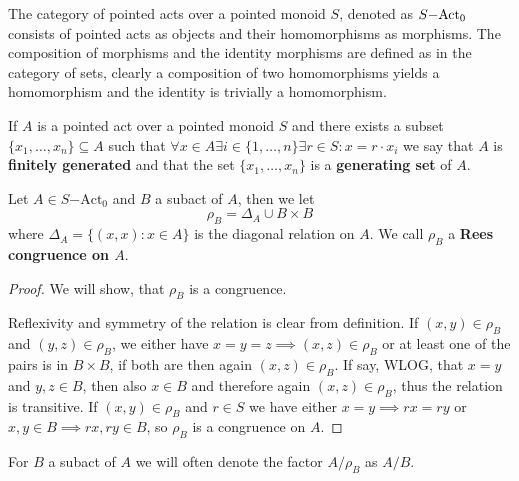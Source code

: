 \begin{remark}
    The category of pointed acts over a pointed monoid $S$, denoted as $S\mathrm{-Act}_0$ consists of pointed acts as objects and their homomorphisms as morphisms.
    The composition of morphisms and the identity morphisms are defined as in the category of sets, clearly a composition of two homomorphisms yields a homomorphism
    and the identity is trivially a homomorphism.
\end{remark}
\begin{definition}
    If $A$ is a pointed act over a pointed monoid $S$ and there exists a subset $\{x_1,\dots,x_n\}\subseteq A$ such that 
    $\forall x\in A \exists i\in\{1,\dots,n\} \exists r\in S : x = r\cdot x_i$ we say that $A$ is \textbf{finitely generated} 
    and that the set $\{x_1,\dots,x_n\}$ is a \textbf{generating set} of $A$.
\end{definition}
\begin{definition}
    Let $A\in S\mathrm{-Act}_0$ and $B$ a subact of $A$, then we let 
    \[
        \rho_B = \Delta_A \cup B\times B
    \]
    where $\Delta_A= \{(x,x): x\in A \}$ is the diagonal relation on $A$. We call $\rho_B$ a \textbf{Rees congruence on $A$}. 
\end{definition}
\begin{proof}
    We will show, that $\rho_B$ is a congruence. \par 
    Reflexivity and symmetry of the relation is clear from definition. If $(x,y)\in\rho_B$ and $(y,z)\in\rho_B$, we either have 
    $x=y=z \implies (x,z)\in\rho_B$ or at least one of the pairs is in $B\times B$, if both are then again $(x,z)\in\rho_B$. If 
    say, WLOG, that $x=y$ and $y,z\in B$, then also $x\in B$ and therefore again $(x,z)\in\rho_B$, thus the relation is transitive. 
    If $(x,y)\in\rho_B$ and $r\in S$ we have either $x=y\implies rx=ry$ or $x,y\in B \implies rx,ry\in B$, so $\rho_B$ is a congruence on $A$.
\end{proof}
\begin{remark}
    For $B$ a subact of $A$ we will often denote the factor $A/\rho_B$ as $A/B$. 
\end{remark}

